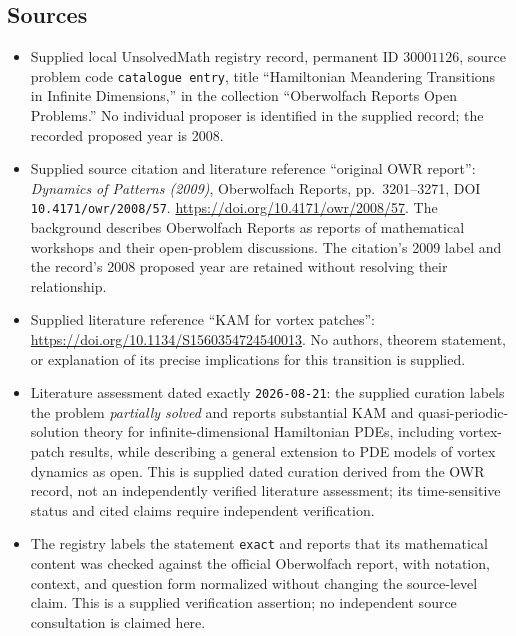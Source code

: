 \documentclass[11pt]{article}
\begin{document}
\subsection{Sources}
\begin{itemize}
\item Supplied local UnsolvedMath registry record, permanent ID \(30001126\), source problem code \texttt{catalogue entry}, title ``Hamiltonian Meandering Transitions in Infinite Dimensions,'' in the collection ``Oberwolfach Reports Open Problems.'' No individual proposer is identified in the supplied record; the recorded proposed year is 2008.
\item Supplied source citation and literature reference ``original OWR report'': \emph{Dynamics of Patterns (2009)}, Oberwolfach Reports, pp.~3201--3271, DOI \texttt{10.4171/owr/2008/57}. \url{https://doi.org/10.4171/owr/2008/57}. The background describes Oberwolfach Reports as reports of mathematical workshops and their open-problem discussions. The citation's 2009 label and the record's 2008 proposed year are retained without resolving their relationship.
\item Supplied literature reference ``KAM for vortex patches'': \url{https://doi.org/10.1134/S1560354724540013}. No authors, theorem statement, or explanation of its precise implications for this transition is supplied.
\item Literature assessment dated exactly \texttt{2026-08-21}: the supplied curation labels the problem \emph{partially solved} and reports substantial KAM and quasi-periodic-solution theory for infinite-dimensional Hamiltonian PDEs, including vortex-patch results, while describing a general extension to PDE models of vortex dynamics as open. This is supplied dated curation derived from the OWR record, not an independently verified literature assessment; its time-sensitive status and cited claims require independent verification.
\item The registry labels the statement \texttt{exact} and reports that its mathematical content was checked against the official Oberwolfach report, with notation, context, and question form normalized without changing the source-level claim. This is a supplied verification assertion; no independent source consultation is claimed here.
\end{itemize}
\end{document}
